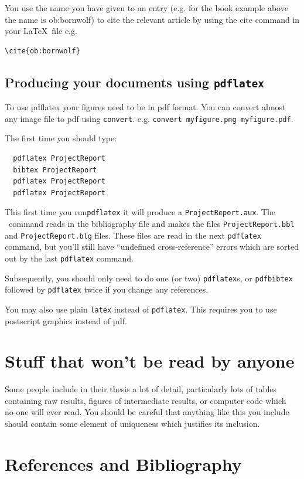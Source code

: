 \documentclass[12pt,a4paper]{report}
\begin{document}
You use the name you have given to an entry (e.g.
for the book example above the name is ob:bornwolf)
to cite the relevant article
by using the cite command in your \LaTeX\ file e.g. 
\begin{verbatim}
\cite{ob:bornwolf}
\end{verbatim}


\section{Producing your documents using \texttt{pdflatex}}

To use pdflatex your figures need to be in pdf format.  You can convert almost any image file to pdf using \texttt{convert}.  e.g. \texttt{convert myfigure.png myfigure.pdf}.

The first time you should type:
\begin{verbatim}
  pdflatex ProjectReport
  bibtex ProjectReport
  pdflatex ProjectReport
  pdflatex ProjectReport
\end{verbatim} 
This first time you run\texttt{pdflatex} it will produce a
\texttt{ProjectReport.aux}.  The \BibTeX\ command reads in the
bibliography file and makes the files \texttt{ProjectReport.bbl} and
\texttt{ProjectReport.blg} files.  These files are read in the next
\texttt{pdflatex} command, but you'll still have ``undefined
cross-reference'' errors which are sorted out by the last
\texttt{pdflatex} command.

Subsequently, you should only need to do one (or two)
\texttt{pdflatex}s, or \texttt{pdfbibtex} followed by
\texttt{pdflatex} twice if you change any references.

\vspace{5mm} You may also use plain \texttt{latex} instead of
\texttt{pdflatex}.  This requires you to use postscript graphics
instead of pdf.




\chapter{Stuff that won't be read by anyone}

Some people include in their thesis a lot of detail, particularly lots
of tables containing raw results, figures of intermediate results, or
computer code which no-one will ever read. You should be careful that
anything like this you include should contain some element of
uniqueness which justifies its inclusion.

\chapter{References and Bibliography}
\printbibliography[heading=none]
\end{document}
